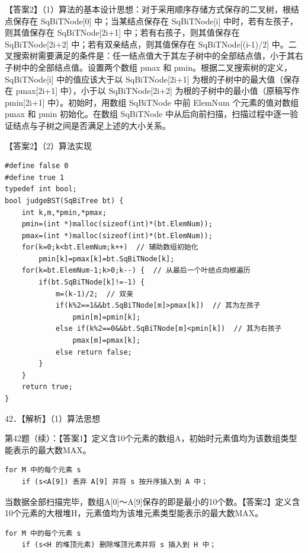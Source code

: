 \documentclass[UTF8,11pt]{ctexart}
\begin{document}
【答案2】（1）算法的基本设计思想：对于采用顺序存储方式保存的二叉树，根结点保存在 SqBiTNode[0] 中；当某结点保存在 SqBiTNode[i] 中时，若有左孩子，则其值保存在 SqBiTNode[2i+1] 中；若有右孩子，则其值保存在 SqBiTNode[2i+2] 中；若有双亲结点，则其值保存在 SqBiTNode[(i-1)/2] 中。二叉搜索树需要满足的条件是：任一结点值大于其左子树中的全部结点值，小于其右子树中的全部结点值。设置两个数组 pmax 和 pmin。根据二叉搜索树的定义，SqBiTNode[i] 中的值应该大于以 SqBiTNode[2i+1] 为根的子树中的最大值（保存在 pmax[2i+1] 中），小于以 SqBiTNode[2i+2] 为根的子树中的最小值（原稿写作 pmin[2i+1] 中）。初始时，用数组 SqBiTNode 中前 ElemNum 个元素的值对数组 pmax 和 pmin 初始化。在数组 SqBiTNode 中从后向前扫描，扫描过程中逐一验证结点与子树之间是否满足上述的大小关系。


【答案2】（2）算法实现


\begin{Verbatim}[breaklines,breakanywhere,fontsize=\small]
#define false 0
#define true 1
typedef int bool;
bool judgeBST(SqBiTree bt) {
    int k,m,*pmin,*pmax;
    pmin=(int *)malloc(sizeof(int)*(bt.ElemNum));
    pmax=(int *)malloc(sizeof(int)*(bt.ElemNum));
    for(k=0;k<bt.ElemNum;k++)  // 辅助数组初始化
        pmin[k]=pmax[k]=bt.SqBiTNode[k];
    for(k=bt.ElemNum-1;k>0;k--) {  // 从最后一个叶结点向根遍历
        if(bt.SqBiTNode[k]!=-1) {
            m=(k-1)/2;  // 双亲
            if(k%2==1&&bt.SqBiTNode[m]>pmax[k])  // 其为左孩子
                pmin[m]=pmin[k];
            else if(k%2==0&&bt.SqBiTNode[m]<pmin[k])  // 其为右孩子
                pmax[m]=pmax[k];
            else return false;
        }
    }
    return true;
}
\end{Verbatim}

42．【解析】（1）算法思想


第42题（续）：【答案1】定义含10个元素的数组A，初始时元素值均为该数组类型能表示的最大数MAX。


\begin{Verbatim}[breaklines,breakanywhere,fontsize=\small]
for M 中的每个元素 s
    if (s<A[9]) 丢弃 A[9] 并将 s 按升序插入到 A 中；
\end{Verbatim}

当数据全部扫描完毕，数组A[0]～A[9]保存的即是最小的10个数。【答案2】定义含10个元素的大根堆H，元素值均为该堆元素类型能表示的最大数MAX。


\begin{Verbatim}[breaklines,breakanywhere,fontsize=\small]
for M 中的每个元素 s
    if (s<H 的堆顶元素) 删除堆顶元素并将 s 插入到 H 中；
\end{Verbatim}
\end{document}
